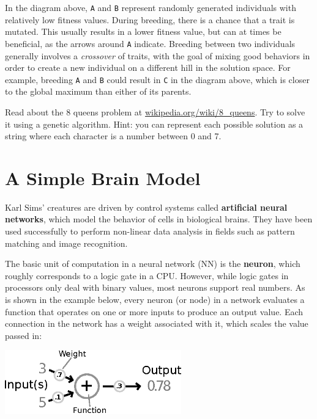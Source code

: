 \documentclass[10pt]{book}
\begin{document}
In the diagram above, {\tt A} and {\tt B} represent randomly generated
individuals with relatively low fitness values. During breeding, there is a
chance that a trait is mutated. This usually results in a lower fitness value,
but can at times be beneficial, as the arrows around {\tt A}
indicate. Breeding between two individuals
generally involves a {\em crossover} of traits, 
with the goal of mixing good behaviors in order to create a new individual 
on a different hill in the solution space. For example, breeding {\tt A} 
and {\tt B} could result in {\tt C} in the diagram above, which is closer 
to the global maximum than either of its parents.
 
\begin{ex}
  Read about the 8 queens problem at \url{wikipedia.org/wiki/8_queens}.
  Try to solve it using a genetic algorithm. Hint: you can represent
  each possible solution as a string where each character is a number
  between 0 and 7.
\end{ex}

\section{A Simple Brain Model}

Karl Sims' creatures are driven by control systems called {\bf artificial neural
networks}, which model the behavior of cells in biological brains. They 
have been used successfully to perform non-linear data analysis in fields such as
pattern matching and image recognition.

The basic unit of computation in a neural network (NN) is the {\bf neuron}, which
roughly corresponds to a logic gate in a CPU. However, while logic gates in 
processors only deal with binary values, most neurons support real numbers.
As is shown in the example below, every neuron (or node) in a network evaluates a 
function that operates on one or more inputs to produce an output value. 
Each connection in the network has a weight associated with it, which scales the value 
passed in:

\beforefig
\centerline{\includegraphics[width=3in]{./figs/Neuron.eps}}
\afterfig
\end{document}
